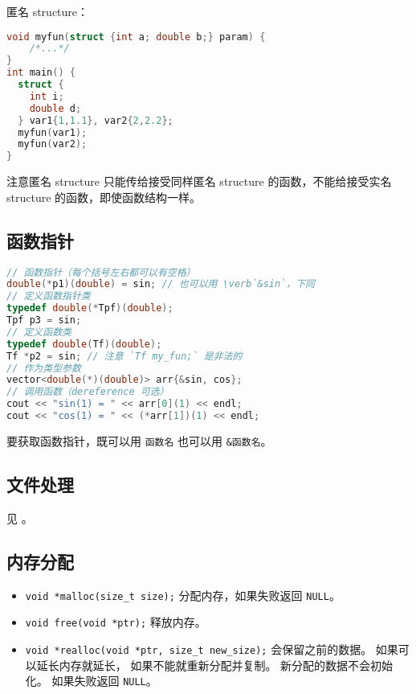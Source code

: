 匿名 structure：
\begin{lstlisting}[language=cpp]
void myfun(struct {int a; double b;} param) {
    /*...*/
}
int main() {
  struct {
    int i;
    double d;
  } var1{1,1.1}, var2{2,2.2};
  myfun(var1);
  myfun(var2);
}
\end{lstlisting}
注意匿名 structure 只能传给接受同样匿名 structure 的函数，不能给接受实名 structure 的函数，即使函数结构一样。

\subsection{函数指针}
\begin{lstlisting}[language=cpp]
// 函数指针（每个括号左右都可以有空格）
double(*p1)(double) = sin; // 也可以用 \verb`&sin`，下同
// 定义函数指针类
typedef double(*Tpf)(double);
Tpf p3 = sin;
// 定义函数类
typedef double(Tf)(double);
Tf *p2 = sin; // 注意 `Tf my_fun;` 是非法的
// 作为类型参数
vector<double(*)(double)> arr{&sin, cos};
// 调用函数（dereference 可选）
cout << "sin(1) = " << arr[0](1) << endl;
cout << "cos(1) = " << (*arr[1])(1) << endl;
\end{lstlisting}

要获取函数指针，既可以用 \verb`函数名` 也可以用 \verb`&函数名`。

\subsection{文件处理}
见 。


\subsection{内存分配}
\begin{itemize}
\item \verb`void *malloc(size_t size);` 分配内存，如果失败返回 \verb`NULL`。
\item \verb`void free(void *ptr);` 释放内存。
\item \verb`void *realloc(void *ptr, size_t new_size);` 会保留之前的数据。 如果可以延长内存就延长， 如果不能就重新分配并复制。 新分配的数据不会初始化。 如果失败返回 \verb`NULL`。
\end{itemize}
